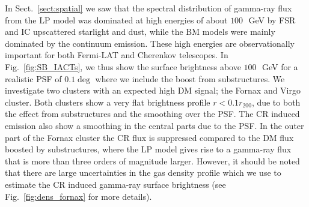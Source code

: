 \documentclass[10pt,aps,pra,reprint,amsmath,amsfonts,amssymb,showpacs,nofootinbib,floatfix]{revtex4-1}
\newcommand{\rvir}{r_{200}}
\begin{document}
In Sect.~\ref{sect:spatial} we saw that the spectral distribution of
gamma-ray flux from the LP model was dominated at high energies of
about $100\,$~GeV by FSR and IC upscattered starlight and dust, while
the BM models were mainly dominated by the continuum emission. These
high energies are observationally important for both Fermi-LAT and
Cherenkov telescopes. In Fig.~\ref{fig:SB_IACTs}, we thus show the
surface brightness above $100\,$~GeV for a realistic PSF of $0.1\deg$
where we include the boost from substructures. We investigate two
clusters with an expected high DM signal; the Fornax and Virgo
cluster. Both clusters show a very flat brightness profile
$r<0.1\rvir$, due to both the effect from substructures and the
smoothing over the PSF. The CR induced emission also show a
smoothing in the central parts due to the PSF. In the outer part of
the Fornax cluster the CR flux is suppressed compared to the DM flux
boosted by substructures, where the LP model gives rise to a gamma-ray
flux that is more than three orders of magnitude larger. However, it
should be noted that there are large uncertainties in the gas density
profile which we use to estimate the CR induced gamma-ray surface
brightness (see Fig.~\ref{fig:dens_fornax} for more details).
\end{document}
